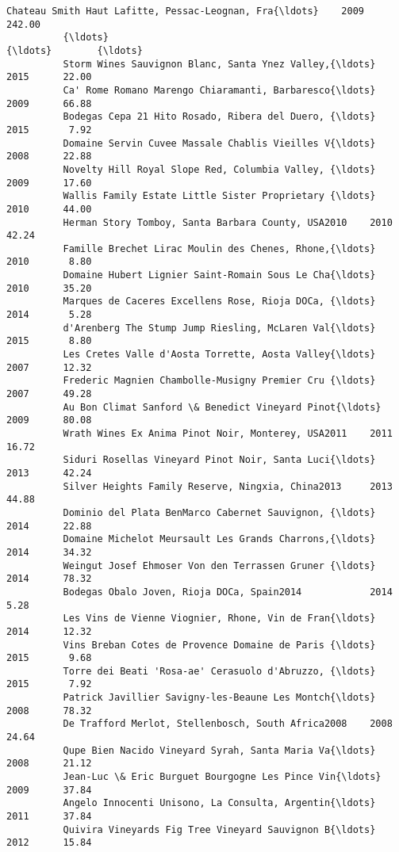 \documentclass[11pt]{article}
\begin{document}
\begin{Verbatim}[commandchars=\\\{\}]
          Chateau Smith Haut Lafitte, Pessac-Leognan, Fra{\ldots}    2009     242.00   
          {\ldots}                                                    {\ldots}        {\ldots}   
          Storm Wines Sauvignon Blanc, Santa Ynez Valley,{\ldots}    2015      22.00   
          Ca' Rome Romano Marengo Chiaramanti, Barbaresco{\ldots}    2009      66.88   
          Bodegas Cepa 21 Hito Rosado, Ribera del Duero, {\ldots}    2015       7.92   
          Domaine Servin Cuvee Massale Chablis Vieilles V{\ldots}    2008      22.88   
          Novelty Hill Royal Slope Red, Columbia Valley, {\ldots}    2009      17.60   
          Wallis Family Estate Little Sister Proprietary {\ldots}    2010      44.00   
          Herman Story Tomboy, Santa Barbara County, USA2010    2010      42.24   
          Famille Brechet Lirac Moulin des Chenes, Rhone,{\ldots}    2010       8.80   
          Domaine Hubert Lignier Saint-Romain Sous Le Cha{\ldots}    2010      35.20   
          Marques de Caceres Excellens Rose, Rioja DOCa, {\ldots}    2014       5.28   
          d'Arenberg The Stump Jump Riesling, McLaren Val{\ldots}    2015       8.80   
          Les Cretes Valle d'Aosta Torrette, Aosta Valley{\ldots}    2007      12.32   
          Frederic Magnien Chambolle-Musigny Premier Cru {\ldots}    2007      49.28   
          Au Bon Climat Sanford \& Benedict Vineyard Pinot{\ldots}    2009      80.08   
          Wrath Wines Ex Anima Pinot Noir, Monterey, USA2011    2011      16.72   
          Siduri Rosellas Vineyard Pinot Noir, Santa Luci{\ldots}    2013      42.24   
          Silver Heights Family Reserve, Ningxia, China2013     2013      44.88   
          Dominio del Plata BenMarco Cabernet Sauvignon, {\ldots}    2014      22.88   
          Domaine Michelot Meursault Les Grands Charrons,{\ldots}    2014      34.32   
          Weingut Josef Ehmoser Von den Terrassen Gruner {\ldots}    2014      78.32   
          Bodegas Obalo Joven, Rioja DOCa, Spain2014            2014       5.28   
          Les Vins de Vienne Viognier, Rhone, Vin de Fran{\ldots}    2014      12.32   
          Vins Breban Cotes de Provence Domaine de Paris {\ldots}    2015       9.68   
          Torre dei Beati 'Rosa-ae' Cerasuolo d'Abruzzo, {\ldots}    2015       7.92   
          Patrick Javillier Savigny-les-Beaune Les Montch{\ldots}    2008      78.32   
          De Trafford Merlot, Stellenbosch, South Africa2008    2008      24.64   
          Qupe Bien Nacido Vineyard Syrah, Santa Maria Va{\ldots}    2008      21.12   
          Jean-Luc \& Eric Burguet Bourgogne Les Pince Vin{\ldots}    2009      37.84   
          Angelo Innocenti Unisono, La Consulta, Argentin{\ldots}    2011      37.84   
          Quivira Vineyards Fig Tree Vineyard Sauvignon B{\ldots}    2012      15.84   
          

\end{Verbatim}
\end{document}
